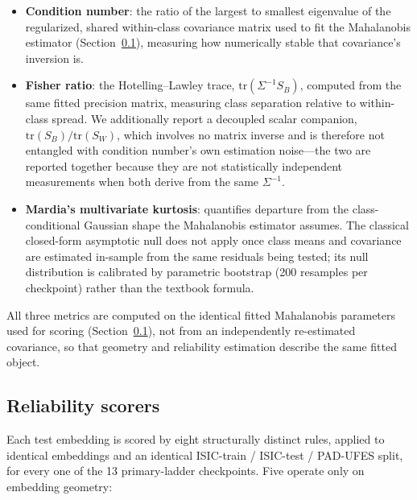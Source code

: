 \begin{itemize}
\item \textbf{Condition number}: the ratio of the largest to smallest eigenvalue of the regularized, shared within-class covariance matrix used to fit the Mahalanobis estimator (Section~\ref{sec:scorers}), measuring how numerically stable that covariance's inversion is.
\item \textbf{Fisher ratio}: the Hotelling--Lawley trace, $\mathrm{tr}(\Sigma^{-1}S_B)$, computed from the same fitted precision matrix, measuring class separation relative to within-class spread. We additionally report a decoupled scalar companion, $\mathrm{tr}(S_B)/\mathrm{tr}(S_W)$, which involves no matrix inverse and is therefore not entangled with condition number's own estimation noise---the two are reported together because they are not statistically independent measurements when both derive from the same $\Sigma^{-1}$.
\item \textbf{Mardia's multivariate kurtosis}: quantifies departure from the class-conditional Gaussian shape the Mahalanobis estimator assumes. The classical closed-form asymptotic null does not apply once class means and covariance are estimated in-sample from the same residuals being tested; its null distribution is calibrated by parametric bootstrap (200 resamples per checkpoint) rather than the textbook formula.
\end{itemize}

All three metrics are computed on the identical fitted Mahalanobis parameters used for scoring (Section~\ref{sec:scorers}), not from an independently re-estimated covariance, so that geometry and reliability estimation describe the same fitted object.

\subsection{Reliability scorers}
\label{sec:scorers}

Each test embedding is scored by eight structurally distinct rules, applied to identical embeddings and an identical ISIC-train / ISIC-test / PAD-UFES split, for every one of the 13 primary-ladder checkpoints. Five operate only on embedding geometry:

